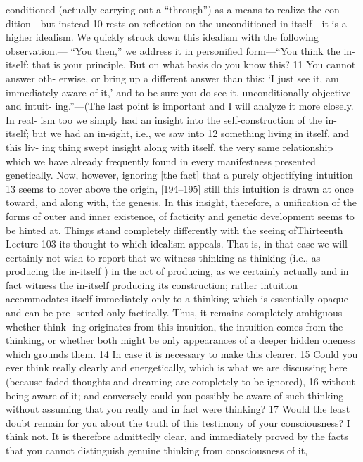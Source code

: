 conditioned (actually carrying out a “through”) as a means to realize the con-
dition—but instead 10 rests on reflection on the unconditioned in-itself—it is a
higher idealism.
We quickly struck down this idealism with the following observation.—
“You then,” we address it in personified form—“You think the in-itself: that is
your principle. But on what basis do you know this? 11 You cannot answer oth-
erwise, or bring up a different answer than this: ‘I just see it, am immediately
aware of it,’ and to be sure you do see it, unconditionally objective and intuit-
ing.”—(The last point is important and I will analyze it more closely. In real-
ism too we simply had an insight into the self-construction of the in-itself; but
we had an in-sight, i.e., we saw into 12 something living in itself, and this liv-
ing thing swept insight along with itself, the very same relationship which we
have already frequently found in every manifestness presented genetically.
Now, however, ignoring [the fact] that a purely objectifying intuition 13 seems
to hover above the origin, [194–195] still this intuition is drawn at once
toward, and along with, the genesis. In this insight, therefore, a unification of
the forms of outer and inner existence, of facticity and genetic development
seems to be hinted at. Things stand completely differently with the seeing ofThirteenth Lecture
103
its thought to which idealism appeals. That is, in that case we will certainly
not wish to report that we witness thinking as thinking (i.e., as producing the
in-itself ) in the act of producing, as we certainly actually and in fact witness
the in-itself producing its construction; rather intuition accommodates itself
immediately only to a thinking which is essentially opaque and can be pre-
sented only factically. Thus, it remains completely ambiguous whether think-
ing originates from this intuition, the intuition comes from the thinking, or
whether both might be only appearances of a deeper hidden oneness which
grounds them. 14
In case it is necessary to make this clearer. 15 Could you ever think really
clearly and energetically, which is what we are discussing here (because faded
thoughts and dreaming are completely to be ignored), 16 without being aware
of it; and conversely could you possibly be aware of such thinking without
assuming that you really and in fact were thinking? 17 Would the least doubt
remain for you about the truth of this testimony of your consciousness? I
think not. It is therefore admittedly clear, and immediately proved by the
facts that you cannot distinguish genuine thinking from consciousness of it,
